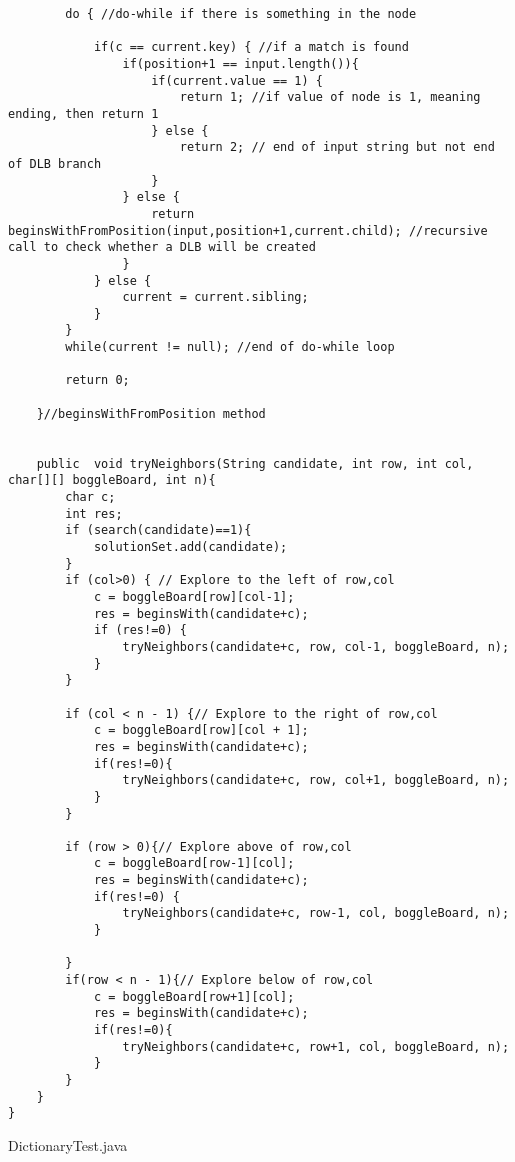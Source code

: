 \documentclass{article}
\begin{document}
\begin{lstlisting}
		do { //do-while if there is something in the node

			if(c == current.key) { //if a match is found
				if(position+1 == input.length()){
					if(current.value == 1) {
						return 1; //if value of node is 1, meaning ending, then return 1 
					} else {
						return 2; // end of input string but not end of DLB branch
					}
				} else {
					return beginsWithFromPosition(input,position+1,current.child); //recursive call to check whether a DLB will be created
				}
			} else {
				current = current.sibling;
			}
		}
		while(current != null); //end of do-while loop

		return 0; 

	}//beginsWithFromPosition method


	public  void tryNeighbors(String candidate, int row, int col, char[][] boggleBoard, int n){
		char c;
		int res;
		if (search(candidate)==1){
			solutionSet.add(candidate);
		}
		if (col>0) { // Explore to the left of row,col
			c = boggleBoard[row][col-1];
			res = beginsWith(candidate+c);
			if (res!=0) {
				tryNeighbors(candidate+c, row, col-1, boggleBoard, n);
			}
		}
		
		if (col < n - 1) {// Explore to the right of row,col
			c = boggleBoard[row][col + 1];
			res = beginsWith(candidate+c);
			if(res!=0){
				tryNeighbors(candidate+c, row, col+1, boggleBoard, n);
			}
		}
			
		if (row > 0){// Explore above of row,col
			c = boggleBoard[row-1][col];
			res = beginsWith(candidate+c);
			if(res!=0) {
				tryNeighbors(candidate+c, row-1, col, boggleBoard, n);
			}

		}
		if(row < n - 1){// Explore below of row,col
			c = boggleBoard[row+1][col];
			res = beginsWith(candidate+c);
			if(res!=0){
				tryNeighbors(candidate+c, row+1, col, boggleBoard, n);
			}
		}
	}
}
\end{lstlisting}
DictionaryTest.java
\end{document}
